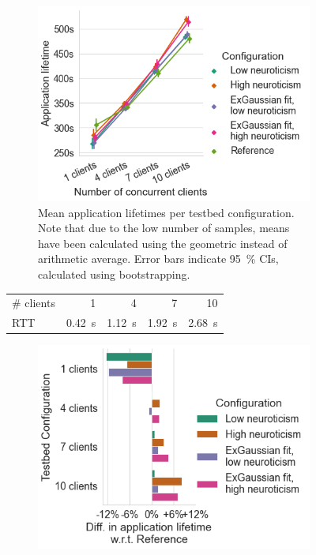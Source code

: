 \begin{figure}
    \centering
    \begin{subfigure}[]{\columnwidth}
        \centering
        \includegraphics[width=.9\textwidth]{figs/new_model/lifetime_testbed.png}
        \caption{%
            Mean application lifetimes per testbed configuration.
            Note that due to the low number of samples, means have been calculated using the geometric instead of arithmetic average. 
            Error bars indicate \SI{95}{\percent} \acp{CI}, calculated using bootstrapping.
        }
    \end{subfigure}
    \par\bigskip
    \begin{subtable}{\columnwidth}
        \centering
        \begin{tabular}{lrrrr}
            \toprule
            \# clients & 1 & 4 & 7 & 10 \\
            \ac{RTT} & \SI{0.42}{\second} & \SI{1.12}{\second} & \SI{1.92}{\second} & \SI{2.68}{\second} \\
            \bottomrule
        \end{tabular}
        \caption{Mean measured \aclp{RTT} for each testbed configuration.}
    \end{subtable}
    \par\bigskip
    \begin{subfigure}[]{\columnwidth}
        \centering
        \includegraphics[width=.9\textwidth]{figs/new_model/lifetime_testbed_diff.png}

\end{subfigure}
\end{figure}
